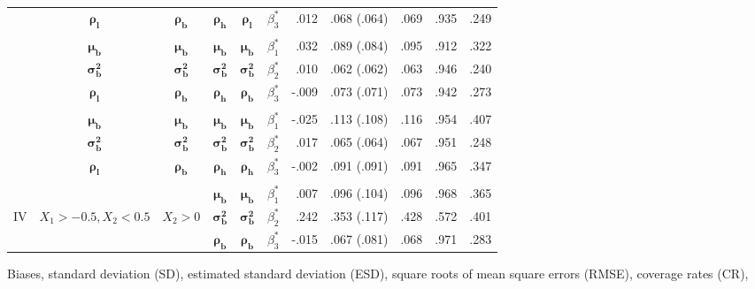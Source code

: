 \documentclass[lineno]{biometrika}
\begin{document}
\begin{table}
{\begin{tabular}{ccccccrcccc}
  & $\boldsymbol{\rho_l}$ & $\boldsymbol{\rho_b}$ & $\boldsymbol{\rho_h}$ & $\boldsymbol{\rho_l}$ & $\beta_{3}^{*}$ &  .012 & .068 (.064) & .069 & .935 & .249 \\   %
  \vspace{-3mm}  & & &&&&&&&& \\
   &  $\boldsymbol{\mu_b}$ & $\boldsymbol{\mu_b}$ & $\boldsymbol{\mu_b}$ & $\boldsymbol{\mu_b}$ & $\beta_{1}^{*}$ &  .032 & .089 (.084) & .095 & .912 & .322  \\
   &  $\boldsymbol{\sigma_b^2}$ & $\boldsymbol{\sigma_b^2}$ & $\boldsymbol{\sigma_b^2}$ & $\boldsymbol{\sigma_b^2}$ &  $\beta_{2}^{*}$&  .010 & .062 (.062) & .063 & .946 & .240 \\
  & $\boldsymbol{\rho_l}$ & $\boldsymbol{\rho_b}$ & $\boldsymbol{\rho_h}$ & $\boldsymbol{\rho_b}$ & $\beta_{3}^{*}$ &  -.009 & .073 (.071) & .073 & .942 & .273 \\   %
  \vspace{-3mm}  & & &&&&&&&& \\
   &  $\boldsymbol{\mu_b}$ & $\boldsymbol{\mu_b}$ & $\boldsymbol{\mu_b}$ & $\boldsymbol{\mu_b}$ & $\beta_{1}^{*}$ &  -.025 & .113 (.108) & .116  & .954 & .407 \\
  &  $\boldsymbol{\sigma_b^2}$ & $\boldsymbol{\sigma_b^2}$ & $\boldsymbol{\sigma_b^2}$ & $\boldsymbol{\sigma_b^2}$ &  $\beta_{2}^{*}$&  .017 & .065 (.064) & .067 & .951 & .248 \\
& $\boldsymbol{\rho_l}$ & $\boldsymbol{\rho_b}$ & $\boldsymbol{\rho_h}$ & $\boldsymbol{\rho_h}$ & $\beta_{3}^{*}$ &  -.002 & .091 (.091) & .091 & .965 & .347 \\   %
  \vspace{-1mm}  & & &&&&&&&& \\
 &  & & $\boldsymbol{\mu_b}$ & $\boldsymbol{\mu_b}$ & $\beta_{1}^{*}$ &  .007 & .096 (.104) & .096  & .968 & .365 \\
 IV &  $X_1>-0.5,X_2<0.5$ & $X_2 > 0$ & $\boldsymbol{\sigma_b^2}$ & $\boldsymbol{\sigma_b^2}$ &  $\beta_{2}^{*}$&  .242 & .353 (.117) & .428 & .572 & .401 \\
  &     &  & $\boldsymbol{\rho_b}$ & $\boldsymbol{\rho_b}$ & $\beta_{3}^{*}$ &  -.015 & .067 (.081) & .068 & .971 & .283 \\   %
\end{tabular}}
\label{table:robustness}
\begin{tabnote}
Biases,
standard deviation (SD),
estimated standard deviation (ESD),
square roots of mean square errors (RMSE),
coverage rates (CR),

\end{tabnote}
\end{table}
\end{document}
